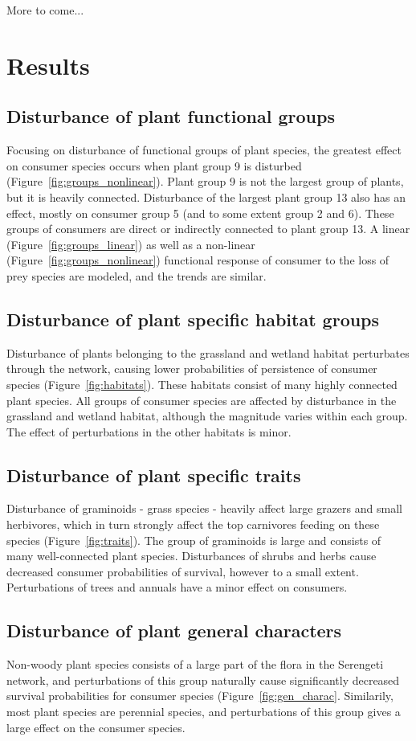 \documentclass[a4paper,11pt]{article}
\begin{document}
More to come...


\section*{Results} 
\subsection*{Disturbance of plant functional groups}
Focusing on disturbance of functional groups of plant species, the greatest effect on consumer species occurs when plant group 9 is disturbed (Figure~\ref{fig:groups_nonlinear}). Plant group 9 is not the largest group of plants, but it is heavily connected. Disturbance of the largest plant group 13 also has an effect, mostly on consumer group 5 (and to some extent group 2 and 6). These groups of consumers are direct or indirectly connected to plant group 13. A linear (Figure~\ref{fig:groups_linear}) as well as a non-linear (Figure~\ref{fig:groups_nonlinear}) functional response of consumer to the loss of prey species are modeled, and the trends are similar.

\subsection*{Disturbance of plant specific habitat groups}
Disturbance of plants belonging to the grassland and wetland habitat perturbates through the network, causing lower probabilities of persistence of consumer species (Figure~\ref{fig:habitats}). These habitats consist of many highly connected plant species. All groups of consumer species are affected by disturbance in the grassland and wetland habitat, although the magnitude varies within each group. The effect of perturbations in the other habitats is minor. 

\subsection*{Disturbance of plant specific traits}
Disturbance of graminoids - grass species - heavily affect large grazers and small herbivores, which in turn strongly affect the top carnivores feeding on these species (Figure~\ref{fig:traits}). The group of graminoids is large and consists of many well-connected plant species. Disturbances of shrubs and herbs cause decreased consumer probabilities of survival, however to a small extent. Perturbations of trees and annuals have a minor effect on consumers. 

\subsection*{Disturbance of plant general characters}
Non-woody plant species consists of a large part of the flora in the Serengeti network, and perturbations of this group naturally cause significantly decreased survival probabilities for consumer species (Figure~\ref{fig:gen_charac}. Similarily, most plant species are perennial species, and perturbations of this group gives a large effect on the consumer species.  
\end{document}
